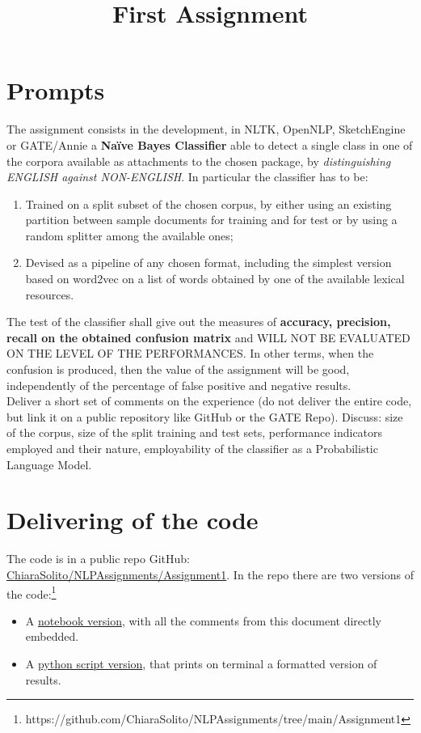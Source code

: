 \documentclass{article}
\begin{document}
    \title{First Assignment}
    \maketitle

    \section{Prompts}
    The assignment consists in the development, in NLTK, OpenNLP, SketchEngine or GATE/Annie a \textbf{Naïve Bayes Classifier} able to detect a single class in one of the corpora available as attachments to the chosen package, by \textit{distinguishing ENGLISH against NON-ENGLISH}. In particular the classifier has to be:
        \begin{enumerate}
            \item Trained on a split subset of the chosen corpus, by either using an existing partition between sample documents for training and for test or by using a random splitter among the available ones;
            \item Devised as a pipeline of any chosen format, including the simplest version based on word2vec on a list of words obtained by one of the available lexical resources.
        \end{enumerate}
    The test of the classifier shall give out the measures of \textbf{accuracy, precision, recall on the obtained confusion matrix} and WILL NOT BE EVALUATED ON THE LEVEL OF THE PERFORMANCES. In other terms, when the confusion is produced, then the value of the assignment will be good, independently of the percentage of false positive and negative results.\\

    Deliver a short set of comments on the experience (do not deliver the entire code, but link it on a public repository like GitHub or the GATE Repo).
    Discuss: size of the corpus, size of the split training and test sets, performance indicators employed and their nature, employability of the classifier as a Probabilistic Language Model.

    \section{Delivering of the code}
    The code is in a public repo GitHub:\\
    \href{https://github.com/ChiaraSolito/NLPAssignments/tree/main/Assignment1}{ChiaraSolito/NLPAssignments/Assignment1}. In the repo there are two versions of the code:\footnote{https://github.com/ChiaraSolito/NLPAssignments/tree/main/Assignment1}
        \begin{itemize}
            \item A \href{https://github.com/ChiaraSolito/NLPAssignments/blob/main/Assignment1/firstAssignment.ipynb}{notebook version}, with all the comments from this document directly embedded.
            \item A \href{https://github.com/ChiaraSolito/NLPAssignments/blob/main/Assignment1/firstAssignment.py}{python script version}, that prints on terminal a formatted version of results.
        \end{itemize}
\end{document}
